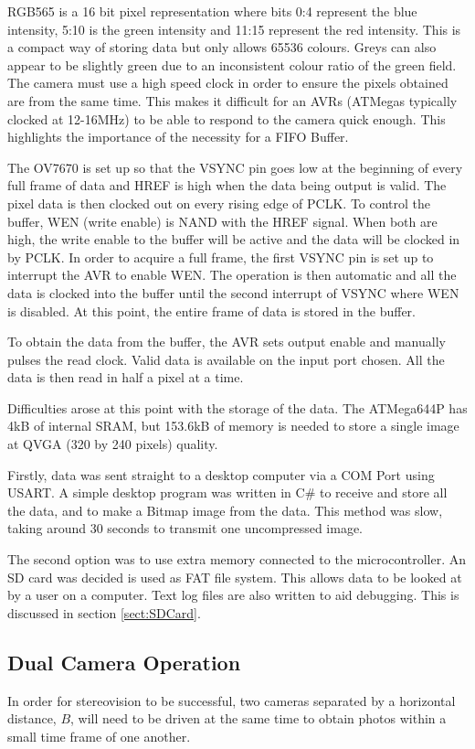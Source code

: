 RGB565 is a 16 bit pixel representation where bits 0:4 represent the blue intensity, 5:10 is the green intensity and 11:15 represent the red intensity. This is a compact way of storing data but only allows 65536 colours. Greys can also appear to be slightly green due to an inconsistent colour ratio of the green field. 
The camera must use a high speed clock in order to ensure the pixels obtained are from the same time. This makes it difficult for an AVRs (ATMegas typically clocked at 12-16MHz) to be able to respond to the camera quick enough. This highlights the importance of the necessity for a FIFO Buffer. 

The OV7670 is set up so that the VSYNC pin goes low at the beginning of every full frame of data and HREF is high when the data being output is valid. The pixel data is then clocked out on every rising edge of PCLK. To control the buffer, WEN (write enable) is NAND with the HREF signal. When both are high, the write enable to the buffer will be active and the data will be clocked in by PCLK. In order to acquire a full frame, the first VSYNC pin is set up to interrupt the AVR to enable WEN. The operation is then automatic and all the data is clocked into the buffer until the second interrupt of VSYNC where WEN is disabled. At this point, the entire frame of data is stored in the buffer.

To obtain the data from the buffer, the AVR sets output enable and manually pulses the read clock. Valid data is available on the input port chosen. All the data is then read in half a pixel at a time. 

Difficulties arose at this point with the storage of the data. The ATMega644P has 4kB of internal SRAM, but  153.6kB of memory is needed to store a single image at QVGA (320 by 240 pixels) quality. 

Firstly, data was sent straight to a desktop computer via a COM Port using USART. A simple desktop program was written in C\# to receive and store all the data, and to make a Bitmap image from the data. This method was slow, taking around 30 seconds to transmit one uncompressed image. 

The second option was to use extra memory connected to the microcontroller. An SD card was decided is used as FAT file system. This allows data to be looked at by a user on a computer. Text log files are also written to aid debugging. This is discussed in section \ref{sect:SDCard}. 
\subsection{Dual Camera Operation}
In order for stereovision to be successful, two cameras separated by a horizontal distance, $B$, will need to be driven at the same time to obtain photos within a small time frame of one another.

